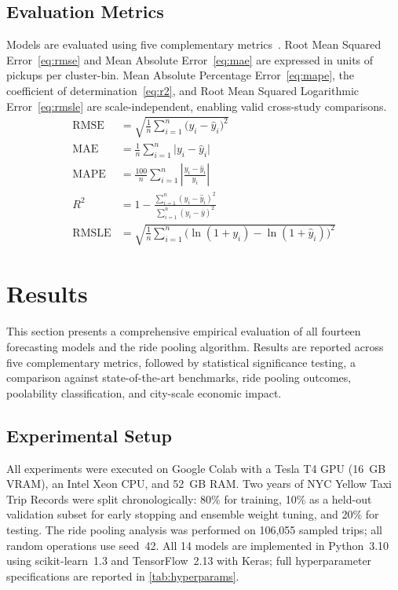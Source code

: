 \documentclass[a4paper,fleqn]{cas-dc}
\begin{document}
\subsection{Evaluation Metrics}
\label{sec:metrics}

Models are evaluated using five complementary metrics~\cite{scikit-learn}.  Root Mean Squared Error~\eqref{eq:rmse} and Mean Absolute Error~\eqref{eq:mae} are expressed in units of pickups per cluster-bin.  Mean Absolute Percentage Error~\eqref{eq:mape}, the coefficient of determination~\eqref{eq:r2}, and Root Mean Squared Logarithmic Error~\eqref{eq:rmsle} are scale-independent, enabling valid cross-study comparisons.
\begin{align}
  \text{RMSE} &= \sqrt{\frac{1}{n}\sum_{i=1}^n \bigl(y_i - \hat{y}_i\bigr)^2} \label{eq:rmse} \\
  \text{MAE}  &= \frac{1}{n}\sum_{i=1}^n \bigl|y_i - \hat{y}_i\bigr| \label{eq:mae} \\
  \text{MAPE} &= \frac{100}{n}\sum_{i=1}^n \left|\frac{y_i - \hat{y}_i}{y_i}\right| \label{eq:mape} \\
  R^2         &= 1 - \frac{\displaystyle\sum_{i=1}^n(y_i-\hat{y}_i)^2}{\displaystyle\sum_{i=1}^n(y_i - \bar{y})^2} \label{eq:r2} \\
  \text{RMSLE}&= \sqrt{\frac{1}{n}\sum_{i=1}^n \bigl(\ln(1+y_i)-\ln(1+\hat{y}_i)\bigr)^2} \label{eq:rmsle}
\end{align}

\section{Results}
\label{sec:eval}

This section presents a comprehensive empirical evaluation of all fourteen forecasting models and the ride pooling algorithm.  Results are reported across five complementary metrics, followed by statistical significance testing, a comparison against state-of-the-art benchmarks, ride pooling outcomes, poolability classification, and city-scale economic impact.

\subsection{Experimental Setup}

All experiments were executed on Google Colab with a Tesla T4 GPU (16~GB VRAM), an Intel Xeon CPU, and 52~GB RAM.  Two years of NYC Yellow Taxi Trip Records were split chronologically: 80\% for training, 10\% as a held-out validation subset for early stopping and ensemble weight tuning, and 20\% for testing.  The ride pooling analysis was performed on 106,055 sampled trips; all random operations use seed~42.  All 14 models are implemented in Python~3.10 using scikit-learn~1.3 and TensorFlow~2.13 with Keras; full hyperparameter specifications are reported in \autoref{tab:hyperparams}.
\end{document}
